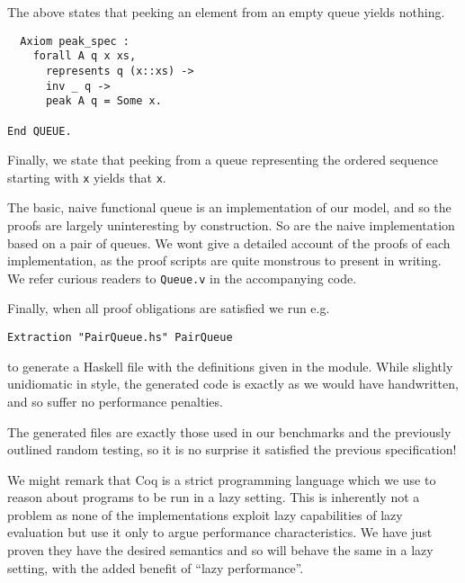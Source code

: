 \documentclass[a4paper, 12pt]{article}
\begin{document}
The above states that peeking an element from an empty queue yields nothing.

\begin{lstlisting}  
  Axiom peak_spec :
    forall A q x xs,
      represents q (x::xs) ->
      inv _ q ->
      peak A q = Some x.

End QUEUE.
\end{lstlisting}

Finally, we state that peeking from a queue representing the ordered
sequence starting with \lstinline{x} yields that \lstinline{x}.

The basic, naive functional queue is an implementation of our model,
and so the proofs are largely uninteresting by construction. So are
the naive implementation based on a pair of queues. We wont give a
detailed account of the proofs of each implementation, as the proof
scripts are quite monstrous to present in writing. We refer curious
readers to \lstinline{Queue.v} in the accompanying code.

Finally, when all proof obligations are satisfied we run
e.g.
\begin{lstlisting}
Extraction "PairQueue.hs" PairQueue
\end{lstlisting}
to generate a Haskell file with the definitions given in the
module. While slightly unidiomatic in style, the generated code is
exactly as we would have handwritten, and so suffer no performance
penalties.

The generated files are exactly those used in our benchmarks and the
previously outlined random testing, so it is no surprise it satisfied
the previous specification!

We might remark that Coq is a strict programming language which we use
to reason about programs to be run in a lazy setting. This is
inherently not a problem as none of the implementations exploit lazy
capabilities of lazy evaluation but use it only to argue performance
characteristics. We have just proven they have the desired semantics
and so will behave the same in a lazy setting, with the added benefit
of ``lazy performance''.
\end{document}
